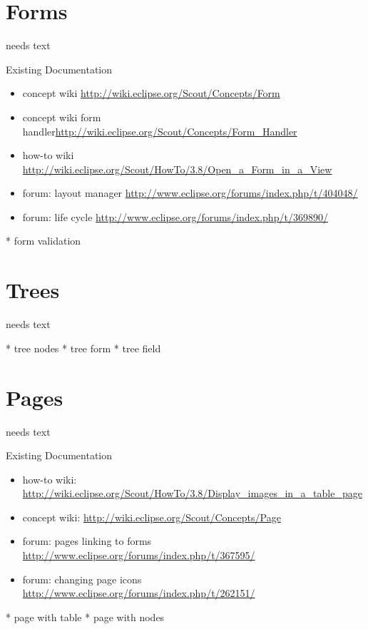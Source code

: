 \documentclass[a4paper,10pt,twoside]{book}
\begin{document}
	
\section{Forms}
needs text

\noindent Existing Documentation
\begin{itemize}
  \item concept wiki \url{http://wiki.eclipse.org/Scout/Concepts/Form}
  \item concept wiki form handler\url{http://wiki.eclipse.org/Scout/Concepts/Form_Handler}
  \item how-to wiki \url{http://wiki.eclipse.org/Scout/HowTo/3.8/Open_a_Form_in_a_View}
  \item forum: layout manager \url{http://www.eclipse.org/forums/index.php/t/404048/}
  \item forum: life cycle \url{http://www.eclipse.org/forums/index.php/t/369890/}
\end{itemize}

	* form validation

\section{Trees}
needs text

    * tree nodes
	* tree form
	* tree field

\section{Pages}
needs text

\noindent Existing Documentation
\begin{itemize}
  \item how-to wiki: \url{http://wiki.eclipse.org/Scout/HowTo/3.8/Display_images_in_a_table_page}	
  \item concept wiki: \url{http://wiki.eclipse.org/Scout/Concepts/Page}
  \item forum: pages linking to forms \url{http://www.eclipse.org/forums/index.php/t/367595/}
  \item forum: changing page icons \url{http://www.eclipse.org/forums/index.php/t/262151/}
\end{itemize}

    * page with table
	* page with nodes
\end{document}
